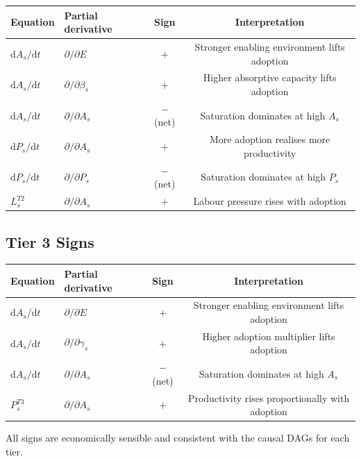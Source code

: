 \documentclass[11pt,a4paper]{article}
\begin{document}
\begin{center}
\begin{tabular}{llcc}
\toprule
Equation & Partial derivative & Sign & Interpretation \\
\midrule
$\mathrm{d}A_s/\mathrm{d}t$ & $\partial/\partial E$ & $+$ & Stronger enabling environment lifts adoption \\
$\mathrm{d}A_s/\mathrm{d}t$ & $\partial/\partial \beta_s$ & $+$ & Higher absorptive capacity lifts adoption \\
$\mathrm{d}A_s/\mathrm{d}t$ & $\partial/\partial A_s$ & $-$ (net) & Saturation dominates at high $A_s$ \\
$\mathrm{d}P_s/\mathrm{d}t$ & $\partial/\partial A_s$ & $+$ & More adoption realises more productivity \\
$\mathrm{d}P_s/\mathrm{d}t$ & $\partial/\partial P_s$ & $-$ (net) & Saturation dominates at high $P_s$ \\
$L_s^{T2}$ & $\partial/\partial A_s$ & $+$ & Labour pressure rises with adoption \\
\bottomrule
\end{tabular}
\end{center}

\subsection{Tier 3 Signs}

\begin{center}
\begin{tabular}{llcc}
\toprule
Equation & Partial derivative & Sign & Interpretation \\
\midrule
$\mathrm{d}A_s/\mathrm{d}t$ & $\partial/\partial E$ & $+$ & Stronger enabling environment lifts adoption \\
$\mathrm{d}A_s/\mathrm{d}t$ & $\partial/\partial \gamma_s$ & $+$ & Higher adoption multiplier lifts adoption \\
$\mathrm{d}A_s/\mathrm{d}t$ & $\partial/\partial A_s$ & $-$ (net) & Saturation dominates at high $A_s$ \\
$P_s^{T3}$ & $\partial/\partial A_s$ & $+$ & Productivity rises proportionally with adoption \\
\bottomrule
\end{tabular}
\end{center}

All signs are economically sensible and consistent with the causal DAGs for each tier.

\end{document}
